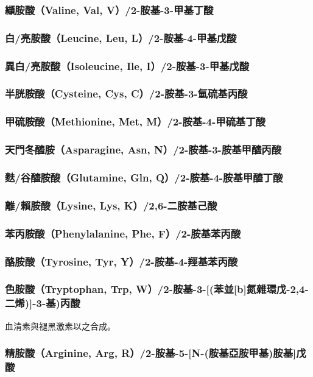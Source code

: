 \documentclass[a4paper,12pt]{report}
\begin{document}
\begin{itemize}
\begin{itemize}
\subsubsection{纈胺酸（Valine, Val, V）/2-胺基-3-甲基丁酸}
\subsubsection{白/亮胺酸（Leucine, Leu, L）/2-胺基-4-甲基戊酸}
\subsubsection{異白/亮胺酸（Isoleucine, Ile, I）/2-胺基-3-甲基戊酸}
\subsubsection{半胱胺酸（Cysteine, Cys, C）/2-胺基-3-氫硫基丙酸}
\subsubsection{甲硫胺酸（Methionine, Met, M）/2-胺基-4-甲硫基丁酸}
\subsubsection{天門冬醯胺（Asparagine, Asn, N）/2-胺基-3-胺基甲醯丙酸}
\subsubsection{麩/谷醯胺酸（Glutamine, Gln, Q）/2-胺基-4-胺基甲醯丁酸}
\subsubsection{離/賴胺酸（Lysine, Lys, K）/2,6-二胺基己酸}
\subsubsection{苯丙胺酸（Phenylalanine, Phe, F）/2-胺基苯丙酸}
\subsubsection{酪胺酸（Tyrosine, Tyr, Y）/2-胺基-4-羥基苯丙酸}
\subsubsection{色胺酸（Tryptophan, Trp, W）/2-胺基-3-[(苯並[b]氮雜環戊-2,4-二烯)]-3-基)丙酸}
血清素與褪黑激素以之合成。
\subsubsection{精胺酸（Arginine, Arg, R）/2-胺基-5-[N-(胺基亞胺甲基)胺基]戊酸}

\end{itemize}
\end{itemize}
\end{document}
